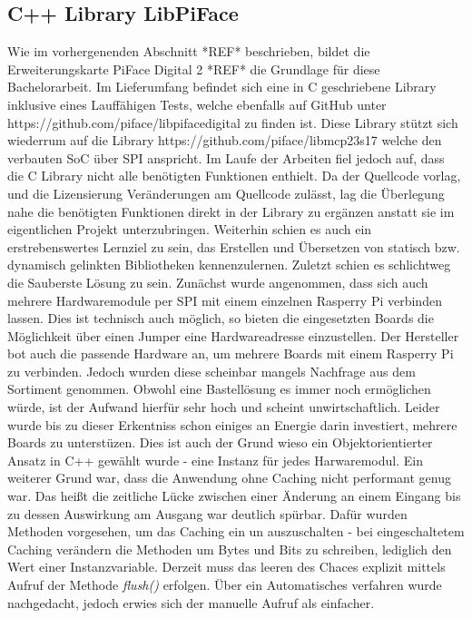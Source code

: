 \subsection{C++ Library LibPiFace}
Wie im vorhergenenden Abschnitt *REF* beschrieben, bildet die Erweiterungskarte PiFace Digital 2 *REF* die Grundlage für diese Bachelorarbeit. Im Lieferumfang befindet sich eine in C geschriebene Library inklusive eines Lauffähigen Tests, welche ebenfalls auf GitHub unter https://github.com/piface/libpifacedigital zu finden ist. Diese Library stützt sich wiederrum auf die Library https://github.com/piface/libmcp23s17 welche den verbauten SoC über SPI anspricht. Im Laufe der Arbeiten fiel jedoch auf, dass die C Library nicht alle benötigten Funktionen enthielt. Da der Quellcode vorlag, und die Lizensierung Veränderungen am Quellcode zulässt, lag die Überlegung nahe die benötigten Funktionen direkt in der Library zu ergänzen anstatt sie im eigentlichen Projekt unterzubringen. Weiterhin schien es auch ein erstrebenswertes Lernziel zu sein, das Erstellen und Übersetzen von statisch bzw. dynamisch gelinkten Bibliotheken kennenzulernen. Zuletzt schien es schlichtweg die Sauberste Lösung zu sein. Zunächst wurde angenommen, dass sich auch mehrere Hardwaremodule per SPI mit einem einzelnen Rasperry Pi verbinden lassen. Dies ist technisch auch möglich, so bieten die eingesetzten Boards die Möglichkeit über einen Jumper eine Hardwareadresse einzustellen. Der Hersteller bot auch die passende Hardware an, um mehrere Boards mit einem Rasperry Pi zu verbinden. Jedoch wurden diese scheinbar mangels Nachfrage aus dem Sortiment genommen. Obwohl eine Bastellösung es immer noch ermöglichen würde, ist der Aufwand hierfür sehr hoch und scheint unwirtschaftlich. Leider wurde bis zu dieser Erkentniss schon einiges an Energie darin investiert, mehrere Boards zu unterstüzen. Dies ist auch der Grund wieso ein Objektorientierter Ansatz in C++ gewählt wurde - eine Instanz für jedes Harwaremodul. Ein weiterer Grund war, dass die Anwendung ohne Caching nicht performant genug war. Das heißt die zeitliche Lücke zwischen einer Änderung an einem Eingang bis zu dessen Auswirkung am Ausgang war deutlich spürbar. Dafür wurden Methoden vorgesehen, um das Caching ein un auszuschalten - bei eingeschaltetem Caching verändern die Methoden um Bytes und Bits zu schreiben, lediglich den Wert einer Instanzvariable. Derzeit muss das leeren des Chaces explizit mittels Aufruf der Methode \textit{flush()} erfolgen. Über ein Automatisches verfahren wurde nachgedacht, jedoch erwies sich der manuelle Aufruf als einfacher. 

    
\clearpage
